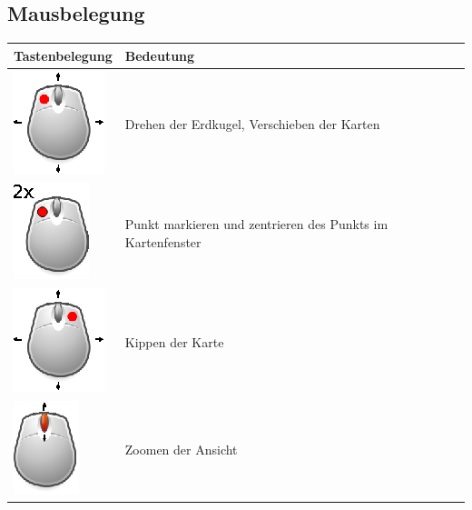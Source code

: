 \documentclass[10pt]{scrreprt}
\begin{document}
\subsection{Mausbelegung}
\vspace{3mm}
\begin{center}
\begin{tabular}{|>{\centering \arraybackslash}m{4cm}|m{8cm}|}
\hline 
\textbf{Tastenbelegung} & \textbf{Bedeutung} \\ 
\hline
\hline
\includegraphics[scale=1.0]{KeyImages/mouseDrag_left.eps} & Drehen der Erdkugel, Verschieben der Karten \\ 
\hline 
\includegraphics[scale=1.0]{KeyImages/mouseDoubleClick_left.eps} & Punkt markieren und zentrieren des Punkts im Kartenfenster \\
\hline
\includegraphics[scale=1.0]{KeyImages/mouseDrag_right.eps} & Kippen der Karte \\
\hline
\includegraphics[scale=1.0]{KeyImages/mouse_scrollen.eps} & Zoomen der Ansicht \\
\hline
\end{tabular} 
\end{center}




\vspace{5mm}
\end{document}

